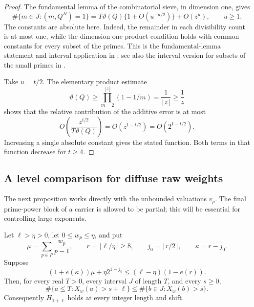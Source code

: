 \begin{proof}
The fundamental lemma of the combinatorial sieve, in dimension one, gives
\[
 \#\{m\in J:(m,Q^{\Pi})=1\}
 =T\vartheta(Q)\{1+O(u^{-u/2})\}+O(z^u),\qquad u\ge1.
\]
The constants are absolute here. Indeed, the remainder in each
divisibility count is at most one, while the dimension-one product
condition holds with common constants for every subset of the primes.
This is the fundamental-lemma statement and interval application in
\cite{Lagarias}; see also the interval version for subsets of the small
primes in \cite[Theorem~1.4.2]{GranvilleSound}.

Take \(u=t/2\). The elementary product estimate
\[
 \vartheta(Q)
 \ge \prod_{m=2}^{\lfloor z\rfloor}(1-1/m)
 =\frac{1}{\lfloor z\rfloor}\ge\frac1z
\]
shows that the relative contribution of the additive error is at most
\[
 O\!\left(\frac{z^{t/2}}{T\vartheta(Q)}\right)
 =O(z^{1-t/2})=O(2^{1-t/2}).
\]
Increasing a single absolute constant gives the stated function. Both
terms in that function decrease for \(t\ge4\).
\end{proof}

\subsection{A level comparison for diffuse raw weights}

The next proposition works directly with the unbounded valuations
\(v_p\). The final prime-power block of a carrier is allowed to be
partial; this will be essential for controlling large exponents.

\begin{proposition}
\label{an:diffuse-level}
Let \(\ell>\eta>0\), let \(0\le w_p\le\eta\), and put
\[
 \mu=\sum_{p\in P}\frac{w_p}{p-1},\qquad
 r=\lfloor\ell/\eta\rfloor\ge8,\qquad
 j_0=\lfloor r/2\rfloor,\qquad \kappa=r-j_0.
\]
Suppose
\begin{equation}
 (1+e(\kappa))\mu+\eta2^{1-j_0}
 \le(\ell-\eta)(1-e(r)).
 \label{an:diffuse-condition}
\end{equation}
Then, for every real \(T>0\), every interval \(J\) of length \(T\), and
every \(s\ge0\),
\begin{equation}
 \#\{a\le T:X_w(a)>s+\ell\}
 \le \#\{b\in J:X_w(b)>s\}.
 \label{an:diffuse-level-ineq}
\end{equation}
Consequently \(H_{1+\ell}\) holds at every integer length and shift.
\end{proposition}

